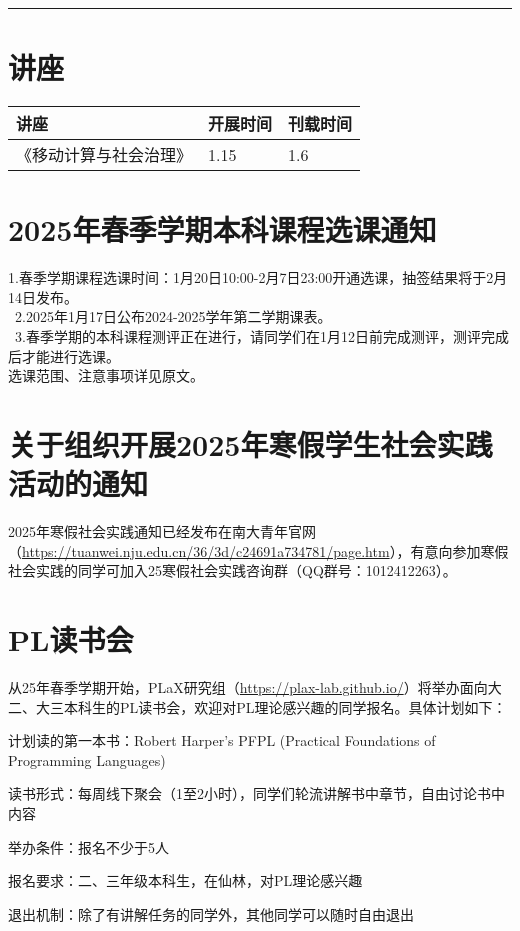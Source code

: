 \documentclass[letterpaper, 12pt]{article}
\begin{document}
\hrule
\pagebreak
\begin{multicols}{2}

\section{讲座}
\begin{tabularx}{0.5\textwidth}{|X|X|X|}
    \hline
    讲座 & 开展时间 & 刊载时间\\
    \hline\hline
    《移动计算与社会治理》 & 1.15 & 1.6\\\hline 

\end{tabularx}
\section{2025年春季学期本科课程选课通知}
1.春季学期课程选课时间：1月20日10:00-2月7日23:00开通选课，抽签结果将于2月14日发布。\\
 2.2025年1月17日公布2024-2025学年第二学期课表。\\
 3.春季学期的本科课程测评正在进行，请同学们在1月12日前完成测评，测评完成后才能进行选课。\\
选课范围、注意事项详见原文。\\

\section{关于组织开展2025年寒假学生社会实践活动的通知}
2025年寒假社会实践通知已经发布在南大青年官网（\url{https://tuanwei.nju.edu.cn/36/3d/c24691a734781/page.htm}），有意向参加寒假社会实践的同学可加入25寒假社会实践咨询群（QQ群号：1012412263）。

\section{PL读书会}
从25年春季学期开始，PLaX研究组（\url{https://plax-lab.github.io/}）将举办面向大二、大三本科生的PL读书会，欢迎对PL理论感兴趣的同学报名。具体计划如下：

计划读的第一本书：Robert Harper's PFPL (Practical Foundations of Programming Languages)

读书形式：每周线下聚会（1至2小时），同学们轮流讲解书中章节，自由讨论书中内容

举办条件：报名不少于5人

报名要求：二、三年级本科生，在仙林，对PL理论感兴趣

退出机制：除了有讲解任务的同学外，其他同学可以随时自由退出


\end{multicols}
\end{document}
